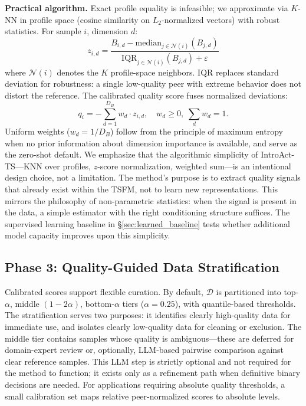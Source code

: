 \documentclass{article}
\begin{document}
\textbf{Practical algorithm.} Exact profile equality is infeasible; we approximate via $K$-NN in profile space (cosine similarity on $L_2$-normalized vectors) with robust statistics. For sample $i$, dimension $d$:
\begin{equation}
    z_{i,d} = \frac{B_{i,d} - \text{median}_{j \in \mathcal{N}(i)}(B_{j,d})}{\text{IQR}_{j \in \mathcal{N}(i)}(B_{j,d}) + \varepsilon}
\end{equation}
where $\mathcal{N}(i)$ denotes the $K$ profile-space neighbors. IQR replaces standard deviation for robustness: a single low-quality peer with extreme behavior does not distort the reference. The calibrated quality score fuses normalized deviations:
\begin{equation}
    q_i = -\sum_{d=1}^{D_B} w_d \cdot z_{i,d}, \quad w_d \geq 0,\; \sum_d w_d = 1.
\end{equation}
Uniform weights ($w_d = 1/D_B$) follow from the principle of maximum entropy when no prior information about dimension importance is available, and serve as the zero-shot default. We emphasize that the algorithmic simplicity of IntroAct-TS---KNN over profiles, $z$-score normalization, weighted sum---is an intentional design choice, not a limitation. The method's purpose is to extract quality signals that already exist within the TSFM, not to learn new representations. This mirrors the philosophy of non-parametric statistics: when the signal is present in the data, a simple estimator with the right conditioning structure suffices. The supervised learning baseline in \S\ref{sec:learned_baseline} tests whether additional model capacity improves upon this simplicity.

\subsection{Phase 3: Quality-Guided Data Stratification}

Calibrated scores support flexible curation. By default, $\mathcal{D}$ is partitioned into top-$\alpha$, middle $(1-2\alpha)$, bottom-$\alpha$ tiers ($\alpha = 0.25$), with quantile-based thresholds. The stratification serves two purposes: it identifies clearly high-quality data for immediate use, and isolates clearly low-quality data for cleaning or exclusion. The middle tier contains samples whose quality is ambiguous---these are deferred for domain-expert review or, optionally, LLM-based pairwise comparison against clear reference samples. This LLM step is strictly optional and not required for the method to function; it exists only as a refinement path when definitive binary decisions are needed. For applications requiring absolute quality thresholds, a small calibration set maps relative peer-normalized scores to absolute levels.
\end{document}
